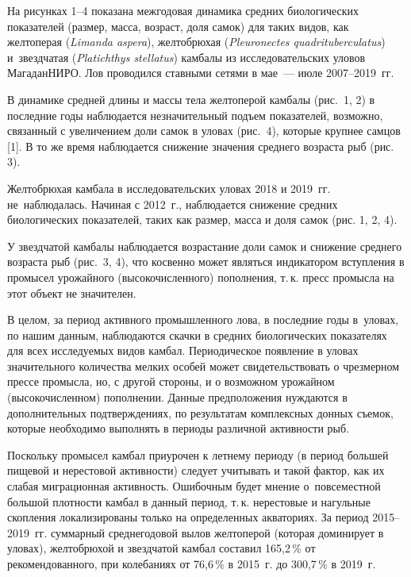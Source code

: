 На рисунках 1--4 показана межгодовая динамика средних биологических показателей (размер, масса, возраст, доля самок) для таких видов, как желтоперая (\textit{Limanda aspera}), желтобрюхая (\textit{Pleuronectes quadrituberculatus}) и~звездчатая (\textit{Platichthys stellatus}) камбалы из исследовательских уловов МагаданНИРО. Лов проводился ставными сетями в мае~--- июле 2007--2019~гг.






В динамике средней длины и массы тела желтоперой камбалы (рис.~1, 2) в последние годы наблюдается незначительный подъем показателей, возможно, связанный с увеличением доли самок в уловах (рис. 4), которые крупнее самцов [1]. В то же время наблюдается снижение значения среднего возраста рыб (рис. 3).

Желтобрюхая камбала в исследовательских уловах 2018 и 2019~гг. не~наблюдалась. Начиная с 2012~г., наблюдается снижение средних биологических показателей, таких как размер, масса и доля самок (рис. 1, 2, 4).

У звездчатой камбалы наблюдается возрастание доли самок и снижение среднего возраста рыб (рис. 3, 4), что косвенно может являться индикатором вступления в промысел урожайного (высокочисленного) пополнения, т.\,к. пресс промысла на этот объект не значителен.

В целом, за период активного промышленного лова, в последние годы в~уловах, по нашим данным, наблюдаются скачки в средних биологических показателях для всех исследуемых видов камбал. Периодическое появление в уловах значительного количества мелких особей может свидетельствовать о чрезмерном прессе промысла, но, с другой стороны, и о возможном урожайном (высокочисленном) пополнении. Данные предположения нуждаются в дополнительных подтверждениях, по результатам комплексных донных съемок, которые необходимо выполнять в периоды различной активности рыб.

Поскольку промысел камбал приурочен к летнему периоду (в период большей пищевой и нерестовой активности) следует учитывать и такой фактор, как их слабая миграционная активность. Ошибочным будет мнение о~повсеместной большой плотности камбал в данный период, т.\,к. нерестовые и нагульные скопления локализированы только на определенных акваториях. За период 2015--2019~гг. суммарный среднегодовой вылов желтоперой (которая доминирует в уловах), желтобрюхой и звездчатой камбал составил 165,2\,\% от рекомендованного, при колебаниях от 76,6\,\% в 2015~г. до 300,7\,\% в 2019~г.



